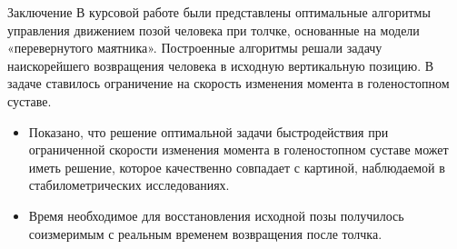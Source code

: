 \documentclass[10pt]{beamer}
\begin{document}
\begin{frame}{Заключение}
	В курсовой работе были представлены оптимальные алгоритмы управления
	движением позой человека при толчке, основанные на модели
	«перевернутого маятника». Построенные алгоритмы решали задачу наискорейшего возвращения человека в исходную вертикальную позицию.
	В задаче ставилось ограничение на скорость изменения момента в голеностопном суставе.
	\begin{itemize}
		\item Показано, что решение оптимальной задачи быстродействия при ограниченной скорости изменения момента в голеностопном суставе может иметь решение, которое качественно совпадает с картиной, наблюдаемой в стабилометрических исследованиях.
		\item Время необходимое для восстановления исходной позы получилось соизмеримым с реальным временем возвращения после толчка.
	\end{itemize}

\end{frame}
\end{document}
